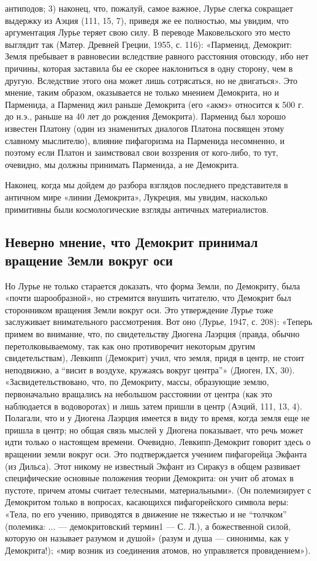 антиподов; 3) наконец, что, пожалуй, самое важное, Лурье слегка
сокращает выдержку из Аэция (111, 15, 7), приведя же ее полностью, мы
увидим, что аргументация Лурье теряет свою силу. В переводе
Маковельского это место выглядит так (Матер. Древней Греции, 1955, с.
116): «Парменид, Демокрит: Земля пребывает в равновесии вследствие
равного расстояния отовсюду, ибо нет причины, которая заставила бы ее
скорее наклониться в одну сторону, чем в другую. Вследствие этого она
может лишь сотрясаться, но не двигаться». Это мнение, таким образом,
оказывается не только мнением Демокрита, но и Парменида, а Парменид
жил раньше Демокрита (его «акмэ» относится к 500 г. до н.э., раньше
на 40 лет до рождения Демокрита). Парменид был хорошо известен Платону
(один из знаменитых диалогов Платона посвящен этому славному
мыслителю), влияние пифагоризма на Парменида несомненно, и поэтому
если Платон и заимствовал свои воззрения от кого-либо, то тут,
очевидно, мы должны принимать Парменида, а не Демокрита.

Наконец, когда мы дойдем до разбора взглядов последнего представителя
в античном мире «линии Демокрита», Лукреция, мы увидим, насколько
примитивны были космологические взгляды античных материалистов.

\subsection{Неверно мнение, что Демокрит принимал вращение Земли
вокруг оси}

Но Лурье не только старается доказать, что форма Земли, по
Демокриту, была «почти шарообразной», но стремится внушить читателю,
что Демокрит был сторонником вращения Земли вокруг оси. Это
утверждение Лурье тоже заслуживает внимательного рассмотрения. Вот оно
(Лурье, 1947, с. 208): «Теперь примем во внимание, что, по
свидетельству Диогена Лаэрция (правда, обычно перетолковываемому, так
как оно противоречит некоторым другим свидетельствам), Левкипп
(Демокрит) учил, что земля, придя в центр, не стоит неподвижно, а
``висит в воздухе, кружаясь вокруг центра''» (Диоген, IX, 30).
«Засвидетельствовано, что, по Демокриту, массы, образующие землю,
первоначально вращались на небольшом расстоянии от центра (как это
наблюдается в водоворотах) и лишь затем пришли в центр (Аэций, 111,
13, 4). Полагали, что и у Диогена Лаэрция имеется в виду то время,
когда земля еще не пришла в центр; но общая связь мыслей у Диогена
показывает, что речь может идти только о настоящем времени. Очевидно,
Левкипп-Демокрит говорит здесь о вращении земли вокруг оси. Это
подтверждается учением пифагорейца Экфанта (из Дильса). Этот никому не
известный Экфант из Сиракуз в общем развивает специфические основные
положения теории Демокрита: он учит об атомах в пустоте, причем атомы
считает телесными, материальными». (Он полемизирует с Демокритом
только в вопросах, касающихся пифагорейского символа веры: «Тела, по
его учению, приводятся в движение не тяжестью и не ``толчком''
(полемика: ... --- демокритовский термин1 --- С. Л.), а божественной
силой, которую он называет разумом и душой» (разум и душа ---
синонимы, как у Демокрита!); «мир возник из соединения атомов, но
управляется провидением»).

